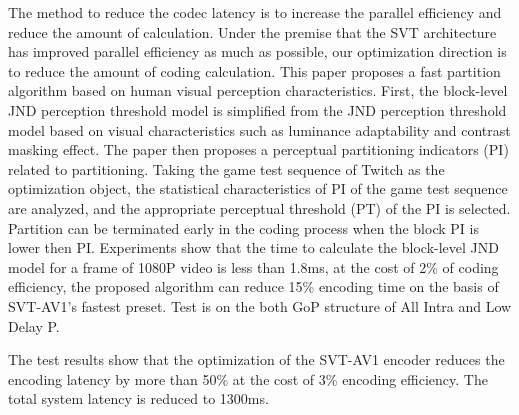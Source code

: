 \begin{enabstract}
  The method to reduce the codec latency is to increase the parallel efficiency and reduce the amount of calculation. Under the premise that the SVT architecture has improved parallel efficiency as much as possible, our optimization direction is to reduce the amount of coding calculation. This paper proposes a fast partition algorithm based on human visual perception characteristics. First, the block-level JND perception threshold model is simplified from the JND perception threshold model based on visual characteristics such as luminance adaptability and contrast masking effect. The paper then proposes a perceptual partitioning indicators (PI) related to partitioning. Taking the game test sequence of Twitch as the optimization object, the statistical characteristics of PI of the game test sequence are analyzed, and the appropriate perceptual threshold (PT) of the PI is selected. Partition can be  terminated early in the coding process when the block PI is lower then PI. Experiments show that the time to calculate the block-level JND model for a frame of 1080P video is less than 1.8ms, at the cost of 2\% of coding efficiency, the proposed algorithm can reduce 15\% encoding time on the basis of SVT-AV1's fastest preset. Test is on the both GoP structure of All Intra and Low Delay P.

  The test results show that the optimization of the SVT-AV1 encoder reduces the encoding latency by more than 50\% at the cost of 3\% encoding efficiency. The total system latency is reduced to 1300ms.
\end{enabstract}
